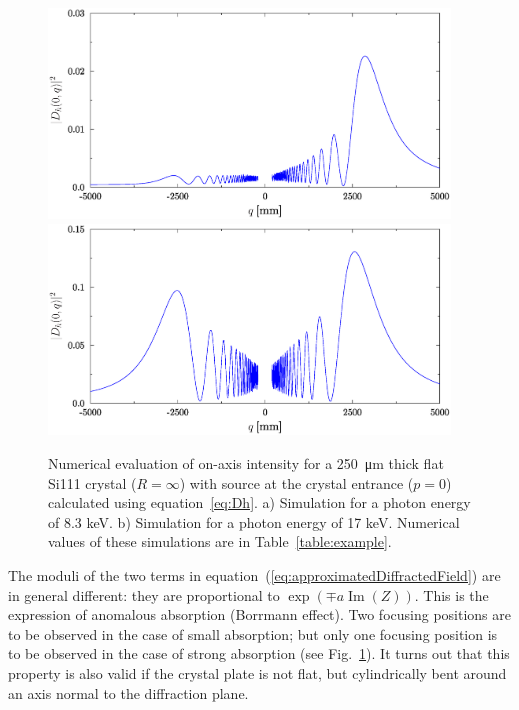 \documentclass[preprint]{iucr}              %
\begin{document}
\begin{figure}
\label{fig:flatLaue}
\caption{Numerical evaluation of on-axis intensity for a  \SI{250}{\micro\meter} thick flat Si111 crystal ($R=\infty$) with source at the crystal entrance ($p=0$) calculated using equation~\ref{eq:Dh}.
a) Simulation for a photon energy of 8.3 keV.
b) Simulation for a photon energy of 17 keV.
Numerical values of these simulations are in Table~\ref{table:example}.
}
\includegraphics[width=0.95\textwidth]{flat8keV.eps}
\includegraphics[width=0.95\textwidth]{flat17keV.eps}
\end{figure}

The moduli of the two terms in equation~(\ref{eq:approximatedDiffractedField}) are in general different: they are proportional to $\exp(\mp a \operatorname{Im}(Z))$. This is the expression of anomalous absorption (Borrmann effect). Two focusing positions are to be observed in the case of small absorption; but only one focusing position is to be observed in the case of strong absorption (see Fig.~\ref{fig:flatLaue}). It turns out that this property is also valid if the crystal plate is not flat, but cylindrically bent around an axis normal to the diffraction plane. 
\end{document}
